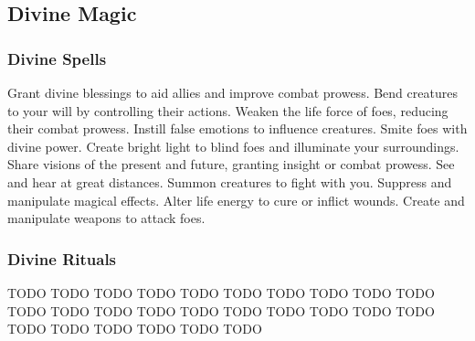 \small
\subsection{Divine Magic}\label{Divine Magic}
\subsubsection{Divine Spells}\label{Divine Spells}
\begin{spelllist}
 Grant divine blessings to aid allies and improve combat prowess.
 Bend creatures to your will by controlling their actions.
 Weaken the life force of foes, reducing their combat prowess.
 Instill false emotions to influence creatures.
 Smite foes with divine power.
 Create bright light to blind foes and illuminate your surroundings.
 Share visions of the present and future, granting insight or combat prowess.
 See and hear at great distances.
 Summon creatures to fight with you.
 Suppress and manipulate magical effects.
 Alter life energy to cure or inflict wounds.
 Create and manipulate weapons to attack foes.
\end{spelllist}

\subsubsection{Divine Rituals}\label{Divine Rituals}
\begin{spelllist}
 TODO
 TODO
 TODO
 TODO
 TODO
 TODO
 TODO
 TODO
 TODO
 TODO
 TODO
 TODO
 TODO
 TODO
 TODO
 TODO
 TODO
 TODO
 TODO
 TODO
 TODO
 TODO
 TODO
 TODO
 TODO
 TODO
\end{spelllist}



